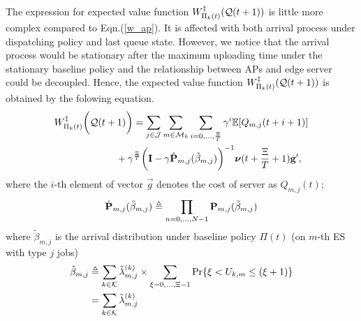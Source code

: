 The expression for expected value function $W^{\ddagger}_{\Pi_{k}(t)}(\mathcal{Q}(t+1))$ is little more complex compared to Eqn.(\ref{w_ap}).
It is affected with both arrival process under dispatching policy and last queue state.
However, we notice that the arrival process would be stationary after the maximum uploading time under the stationary baseline policy and the relationship between APs and edge server could be decoupled.
Hence, the expected value function $W^{\ddagger}_{\Pi_{k}(t)}(\mathcal{Q}(t+1))$ is obtained by the folowing equation.
\begin{align}
    &W^{\ddagger}_{\Pi_{k}(t)}\bigg(\mathcal{Q}(t+1)\bigg)
    = \sum_{j\in\mathcal{J}}\sum_{m\in\mathcal{M}_{k}}\sum_{i=0,\dots,\frac{\Xi}{T}} \gamma^{i} \mathbb{E}[ Q_{m,j}({t+i+1}) ]
    \nonumber\\
    &~~~~~~~~~~~~~~~~~~~+ \gamma^{\frac{\Xi}{T}} \bigg( \mathbf{I} - \gamma \hat{\mathbf{P}}_{m,j}(\tilde{\beta}_{m,j}) \bigg)^{-1} \boldsymbol{\nu}({t+\frac{\Xi}{T}+1}) \mathbf{g}',
\end{align}
where the $i$-th element of vector $\vec{g}$ denotes the cost of server as $Q_{m,j}(t)$;
\begin{align}
    \hat{\mathbf{P}}_{m,j}(\tilde{\beta}_{m,j}) \triangleq \prod_{n=0,\dots,N-1} \mathbf{P}_{m,j}(\tilde{\beta}_{m,j})
\end{align}
where $\tilde{\beta}_{m,j}$ is the arrival distribution under baseline policy $\Pi(t)$ (on $m$-th ES with type $j$ jobs)
\begin{align}
    \tilde{\beta}_{m,j} &\triangleq \sum_{k\in\mathcal{K}} \tilde{\lambda}^{(k)}_{m,j} \times \sum_{\xi=0,\dots,\Xi-1} \Pr\{ \xi<U_{k,m}\leq(\xi+1) \}
        \nonumber\\
    ~~~~&= \sum_{k\in\mathcal{K}} \tilde{\lambda}^{(k)}_{m,j}
\end{align}

